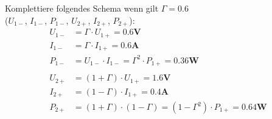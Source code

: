 
\begin{karte}{Komplettiere folgendes Schema wenn gilt $\Gamma = 0.6$\\($U_{1-}$, $I_{1-}$, $P_{1-}$, $U_{2+}$, $I_{2+}$, $P_{2+}$):\\[2pt]
	\scalebox{0.62}{}}
	\begin{align*}
		U_{1-} &= \Gamma \cdot U_{1+} = \mathbf{0.6V}\\
		I_{1-} &= \Gamma \cdot I_{1+} = \mathbf{0.6A}\\
		P_{1-} &= U_{1-} \cdot I_{1-} = \Gamma^2 \cdot P_{1+} = \mathbf{0.36W}\\
		&\\
		U_{2+} &= (1+\Gamma) \cdot U_{1+} = \mathbf{1.6V}\\
		I_{2+} &= (1-\Gamma) \cdot I_{1+} = \mathbf{0.4A}\\
		P_{2+} &= (1+\Gamma) \cdot (1-\Gamma) = (1 - \Gamma^2) \cdot P_{1+} = \mathbf{0.64W}
	\end{align*}
\end{karte}
